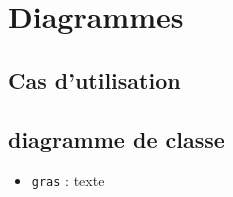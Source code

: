 %
\section{Diagrammes}
%
\subsection{Cas d'utilisation}
%
\subsection{diagramme de classe}
%

\begin{itemize}[leftmargin=2cm]
\item \texttt{gras} : texte
\end{itemize}



